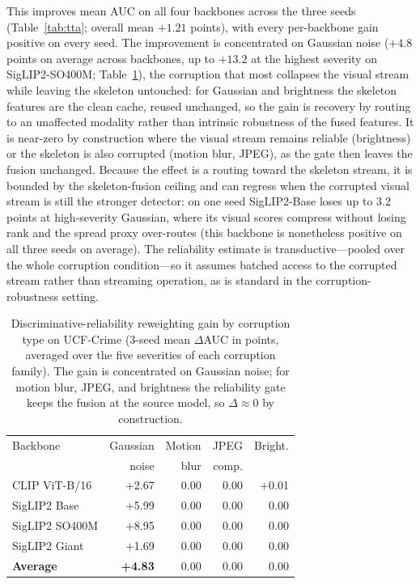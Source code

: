 \documentclass[sigconf]{acmart}
\begin{document}
This improves mean AUC on all four backbones across the three seeds (Table~\ref{tab:tta}; overall mean $+1.21$ points), with every per-backbone gain positive on every seed. The improvement is concentrated on Gaussian noise ($+4.8$ points on average across backbones, up to $+13.2$ at the highest severity on SigLIP2-SO400M; Table~\ref{tab:tta_breakdown}), the corruption that most collapses the visual stream while leaving the skeleton untouched: for Gaussian and brightness the skeleton features are the clean cache, reused unchanged, so the gain is recovery by routing to an unaffected modality rather than intrinsic robustness of the fused features. It is near-zero by construction where the visual stream remains reliable (brightness) or the skeleton is also corrupted (motion blur, JPEG), as the gate then leaves the fusion unchanged. Because the effect is a routing toward the skeleton stream, it is bounded by the skeleton-fusion ceiling and can regress when the corrupted visual stream is still the stronger detector: on one seed SigLIP2-Base loses up to $3.2$ points at high-severity Gaussian, where its visual scores compress without losing rank and the spread proxy over-routes (this backbone is nonetheless positive on all three seeds on average). The reliability estimate is transductive---pooled over the whole corruption condition---so it assumes batched access to the corrupted stream rather than streaming operation, as is standard in the corruption-robustness setting.

\begin{table}[t]
\centering
\caption{Discriminative-reliability reweighting gain by corruption type on UCF-Crime (3-seed mean $\Delta$AUC in points, averaged over the five severities of each corruption family). The gain is concentrated on Gaussian noise; for motion blur, JPEG, and brightness the reliability gate keeps the fusion at the source model, so $\Delta\approx0$ by construction.}
\label{tab:tta_breakdown}
\begin{tabular}{lrrrr}
\toprule
Backbone & Gaussian & Motion & JPEG & Bright. \\
 & noise & blur & comp. & \\
\midrule
CLIP ViT-B/16  & +2.67 & 0.00 & 0.00 & +0.01 \\
SigLIP2 Base   & +5.99 & 0.00 & 0.00 & 0.00 \\
SigLIP2 SO400M & +8.95 & 0.00 & 0.00 & 0.00 \\
SigLIP2 Giant  & +1.69 & 0.00 & 0.00 & 0.00 \\
\midrule
\textbf{Average} & \textbf{+4.83} & 0.00 & 0.00 & 0.00 \\
\bottomrule
\end{tabular}
\end{table}
\end{document}
